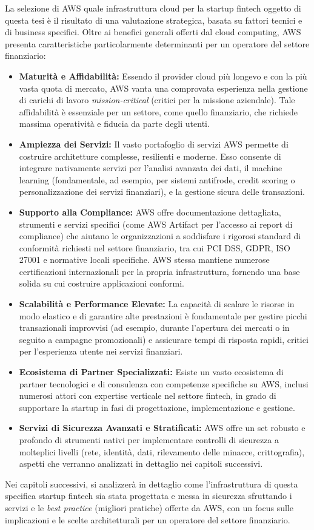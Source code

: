 La selezione di AWS quale infrastruttura cloud per la startup fintech oggetto di questa tesi è il risultato di una valutazione strategica, basata su fattori tecnici e di business specifici. Oltre ai benefici generali offerti dal cloud computing, AWS presenta caratteristiche particolarmente determinanti per un operatore del settore finanziario:
\begin{itemize}
    \item \textbf{Maturità e Affidabilità:} Essendo il provider cloud più longevo e con la più vasta quota di mercato, AWS vanta una comprovata esperienza nella gestione di carichi di lavoro \textit{mission-critical} (critici per la missione aziendale). Tale affidabilità è essenziale per un settore, come quello finanziario, che richiede massima operatività e fiducia da parte degli utenti.
    \item \textbf{Ampiezza dei Servizi:} Il vasto portafoglio di servizi AWS permette di costruire architetture complesse, resilienti e moderne. Esso consente di integrare nativamente servizi per l'analisi avanzata dei dati, il machine learning (fondamentale, ad esempio, per sistemi antifrode, credit scoring o personalizzazione dei servizi finanziari), e la gestione sicura delle transazioni.
    \item \textbf{Supporto alla Compliance:} AWS offre documentazione dettagliata, strumenti e servizi specifici (come AWS Artifact per l'accesso ai report di compliance) che aiutano le organizzazioni a soddisfare i rigorosi standard di conformità richiesti nel settore finanziario, tra cui PCI DSS, GDPR, ISO 27001 e normative locali specifiche. AWS stessa mantiene numerose certificazioni internazionali per la propria infrastruttura, fornendo una base solida su cui costruire applicazioni conformi.
    \item \textbf{Scalabilità e Performance Elevate:} La capacità di scalare le risorse in modo elastico e di garantire alte prestazioni è fondamentale per gestire picchi transazionali improvvisi (ad esempio, durante l'apertura dei mercati o in seguito a campagne promozionali) e assicurare tempi di risposta rapidi, critici per l'esperienza utente nei servizi finanziari.
    \item \textbf{Ecosistema di Partner Specializzati:} Esiste un vasto ecosistema di partner tecnologici e di consulenza con competenze specifiche su AWS, inclusi numerosi attori con expertise verticale nel settore fintech, in grado di supportare la startup in fasi di progettazione, implementazione e gestione.
    \item \textbf{Servizi di Sicurezza Avanzati e Stratificati:} AWS offre un set robusto e profondo di strumenti nativi per implementare controlli di sicurezza a molteplici livelli (rete, identità, dati, rilevamento delle minacce, crittografia), aspetti che verranno analizzati in dettaglio nei capitoli successivi.
\end{itemize}
Nei capitoli successivi, si analizzerà in dettaglio come l'infrastruttura di questa specifica startup fintech sia stata progettata e messa in sicurezza sfruttando i servizi e le \textit{best practice} (migliori pratiche) offerte da AWS, con un focus sulle implicazioni e le scelte architetturali per un operatore del settore finanziario.

